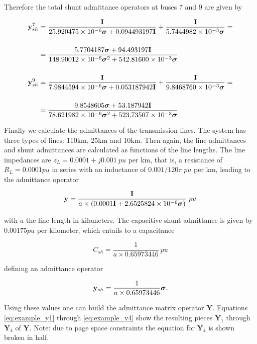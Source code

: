 	Therefore the total shunt admittance operators at buses 7 and 9 are given by

\begin{align}
	\mathbf{y}_{sh}^7 &= \dfrac{\mathbf{I}}{25.920475\times 10^{-6}\boldsymbol{\sigma} + 0.094493197\mathbf{I}} + \dfrac{\mathbf{I}}{5.7444982\times 10^{-3}\boldsymbol{\sigma}} = \nonumber\\[5mm]
		&= \dfrac{5.7704187\boldsymbol{\sigma} + 94.493197\mathbf{I}}{148.90012\times 10^{-6}\boldsymbol{\sigma}^{2} + 542.81600\times 10^{-3}\boldsymbol{\sigma}} \\[5mm]
	\mathbf{y}_{sh}^9 &= \dfrac{\mathbf{I}}{7.9844594\times 10^{-6}\boldsymbol{\sigma} + 0.053187942\mathbf{I}} + \dfrac{\mathbf{I}}{9.8468760\times 10^{-3}\boldsymbol{\sigma}} = \nonumber\\[5mm]
		&= \dfrac{9.8548605\boldsymbol{\sigma} + 53.187942\mathbf{I}}{78.621982\times 10^{-6}\boldsymbol{\sigma}^{2} + 523.73507\times 10^{-3}\boldsymbol{\sigma}}
\end{align}

	Finally we calculate the admittances of the transmission lines. The system has three types of lines: 110km, 25km and 10km. Then again, the line admittances and shunt admittances are calculated as functions of the line lengths. The line impedances are $z_L = 0.0001 + j0.001\ pu$ per km, that is, a resistance of $R_L = 0.0001pu$ in series with an inductance of $0.001/120\pi\ pu$ per km, leading to the admittance operator

\begin{equation} \mathbf{y} = \dfrac{\mathbf{I}}{a\times \left( 0.0001\mathbf{I} + 2.6525824\times 10^{-6}\dpo \right)}\ pu \end{equation}

	\noindent with $a$ the line length in kilometers. The capacitive shunt admittance is given by $0.00175pu$ per kilometer, which entails to a capacitance

\begin{equation} C_{sh} = \dfrac{1}{a\times 0.65973446}\ pu \end{equation}

	\noindent defining an admittance operator

\begin{equation} \mathbf{y}_{sh} = \dfrac{1}{a\times 0.65973446}\boldsymbol{\sigma} .\end{equation}

	Using these values one can build the admittance matrix operator $\mathbf{Y}$. Equations \eqref{eq:example_y1} through \eqref{eq:example_y4} show the resulting pieces $\mathbf{Y}_1$ through $\mathbf{Y}_4$ of $\mathbf{Y}$. Note: due to page space constraints the equation for $\mathbf{Y}_4$ is shown broken in half.

